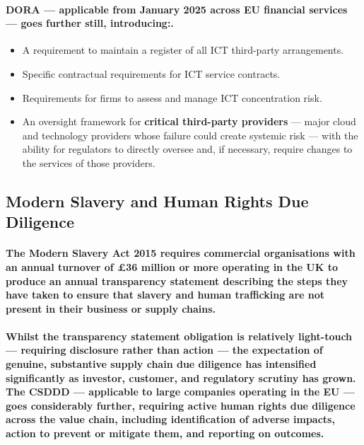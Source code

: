 \paragraph{DORA — applicable from January 2025 across EU financial services — goes further still, introducing:.}
\begin{itemize}
    \item{A requirement to maintain a register of all ICT third-party arrangements.}
    \item{Specific contractual requirements for ICT service contracts.}
    \item{Requirements for firms to assess and manage ICT concentration risk.}
    \item{An oversight framework for \textbf{critical third-party providers} — major cloud and technology providers whose failure could create systemic risk — with the ability for regulators to directly oversee and, if necessary, require changes to the services of those providers.}
\end{itemize}

\subsection{Modern Slavery and Human Rights Due Diligence}
\paragraph{The \textbf{Modern Slavery Act 2015} requires commercial organisations with an annual turnover of £36 million or more operating in the UK to produce an annual transparency statement describing the steps they have taken to ensure that slavery and human trafficking are not present in their business or supply chains.}
\paragraph{Whilst the transparency statement obligation is relatively light-touch — requiring disclosure rather than action — the expectation of genuine, substantive supply chain due diligence has intensified significantly as investor, customer, and regulatory scrutiny has grown. The CSDDD — applicable to large companies operating in the EU — goes considerably further, requiring active human rights due diligence across the value chain, including identification of adverse impacts, action to prevent or mitigate them, and reporting on outcomes.}
